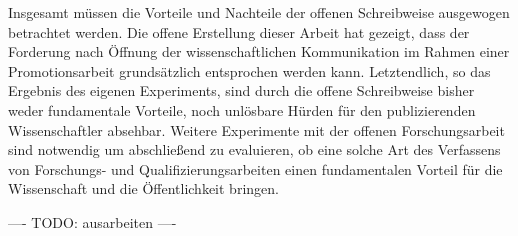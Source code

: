 Insgesamt müssen die Vorteile und Nachteile der offenen Schreibweise ausgewogen betrachtet werden. Die offene Erstellung dieser Arbeit hat gezeigt, dass der Forderung nach Öffnung der wissenschaftlichen Kommunikation im Rahmen einer Promotionsarbeit grundsätzlich entsprochen werden kann. Letztendlich, so das Ergebnis des eigenen Experiments, sind durch die offene Schreibweise bisher weder fundamentale Vorteile, noch unlösbare Hürden für den publizierenden Wissenschaftler absehbar. Weitere Experimente mit der offenen Forschungsarbeit sind notwendig um abschließend zu evaluieren, ob eine solche Art des Verfassens von Forschungs- und Qualifizierungsarbeiten einen fundamentalen Vorteil für die Wissenschaft und die Öffentlichkeit bringen.

---- TODO: ausarbeiten ----
